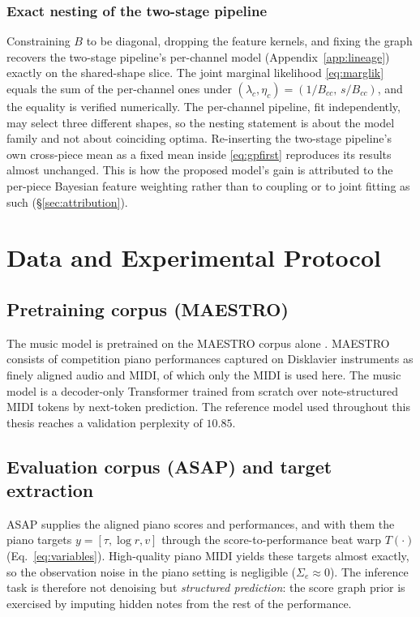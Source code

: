 \documentclass[11pt,a4paper]{report}
\begin{document}
\subsection{Exact nesting of the two-stage pipeline}
Constraining $B$ to be diagonal, dropping the feature kernels, and fixing
the graph recovers the two-stage pipeline's per-channel model
(Appendix~\ref{app:lineage}) exactly on the shared-shape slice. The joint
marginal likelihood \eqref{eq:marglik} equals the sum of the per-channel
ones under $(\lambda_c, \eta_c) = (1/B_{cc},\, s/B_{cc})$, and the equality
is verified numerically. The per-channel pipeline, fit independently, may
select three different shapes, so the nesting statement is about the model
family and not about coinciding optima. Re-inserting the
two-stage pipeline's own cross-piece mean as a fixed mean inside
\eqref{eq:gpfirst} reproduces its results almost unchanged. This is how the
proposed model's gain is attributed to the per-piece Bayesian feature
weighting rather than to coupling or to joint fitting as such
(\S\ref{sec:attribution}).


\chapter{Data and Experimental Protocol}\label{ch:data}

\section{Pretraining corpus (MAESTRO)}
The music model is pretrained on the MAESTRO corpus alone \cite{maestro}.
MAESTRO consists of competition piano performances captured on Disklavier
instruments as finely aligned audio and MIDI, of which only the MIDI is used
here. The music model is a decoder-only Transformer trained from scratch over
note-structured MIDI tokens by next-token prediction. The reference model used
throughout this thesis reaches a validation perplexity of $10.85$.

\section{Evaluation corpus (ASAP) and target extraction}
ASAP \cite{asap} supplies the aligned piano scores and performances, and
with them the piano targets $y = [\tau, \log r, v]$
through the score-to-performance beat warp $T(\cdot)$ (Eq.~\ref{eq:variables}).
High-quality piano MIDI yields these targets almost exactly, so the
observation noise in the piano setting is negligible ($\Sigma_e \approx 0$).
The inference task is therefore not denoising but \emph{structured
prediction}: the score graph prior is exercised by imputing hidden notes from
the rest of the performance.
\end{document}
